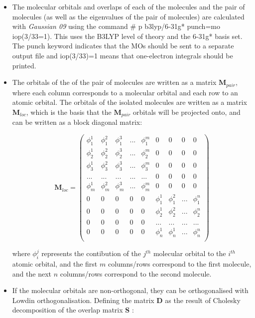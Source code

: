 \documentclass[a4paper,12pt]{article}
\begin{document}
\begin{itemize}

\item The molecular orbitals and overlaps of each of the molecules and the pair of molecules (as well as the eigenvalues of the pair of molecules) are calculated with \textit{Gaussian 09} using the command \# p b3lyp/6-31g* punch=mo iop(3/33=1). This uses the B3LYP level of theory and the 6-31g* basis set. The punch keyword indicates that the MOs should be sent to a separate output file and iop(3/33)=1 means that one-electron integrals should be printed. 

\item The orbitals of the of the pair of molecules are written as a matrix $\textbf{M}_{pair}$, where each column corresponds to a molecular orbital and each row to an atomic orbital. The orbitals of the isolated molecules are written as a matrix $\textbf{M}_{loc}$,  which is the basis that the $\textbf{M}_{pair}$ orbitals will be projected onto, and can be written as a block diagonal matrix:

 \[  \textbf{M}_{loc} = \left( \begin{array}{ccccccccc}
\phi_1^1 &  \phi_1^2 & \phi_1^3 & ... & \phi_1^m  & 0 & 0 & 0 & 0\\
\phi_2^1 &  \phi_2^2 & \phi_2^3 & ... & \phi_2^m & 0 & 0 & 0 & 0 \\
\phi_3^1 &  \phi_3^2 & \phi_3^3 & ... & \phi_3^m & 0 & 0 & 0 & 0 \\
... & ... & ... & ... & ...& 0 & 0 & 0 & 0\\
\phi_m^1 &  \phi_m^2 & \phi_m^3 & ... & \phi_m^m & 0 & 0 & 0 & 0\\
0 & 0 & 0 & 0 & 0 & \phi_1^1 &  \phi_1^2 & ... & \phi_1^n\\
0 & 0 & 0 & 0 & 0 & \phi_2^1 &  \phi_2^2 & ... & \phi_2^n\\
0 & 0 & 0 & 0 & 0 & ... & ... & ... & ... \\
0 & 0 & 0 & 0 & 0 & \phi_n^1 &  \phi_n^1 & ... & \phi_n^n\\
 \end{array} \right)\] 


 where $\phi_i^j$ represents the contibution of the $j^{th}$ molecular orbital to the $i^{th}$ atomic orbital, and the first $m$ columns/rows correspond to the first molecule, and the next $n$ columns/rows correspond to the second molecule.  \\

\item If the molecular orbitals are non-orthogonal, they can be orthogonalised with Lowdin orthogonalisation. Defining the matrix $\textbf{D}$ as the result of Cholesky decomposition of the overlap matrix \textbf{S} :


\end{itemize}
\end{document}
